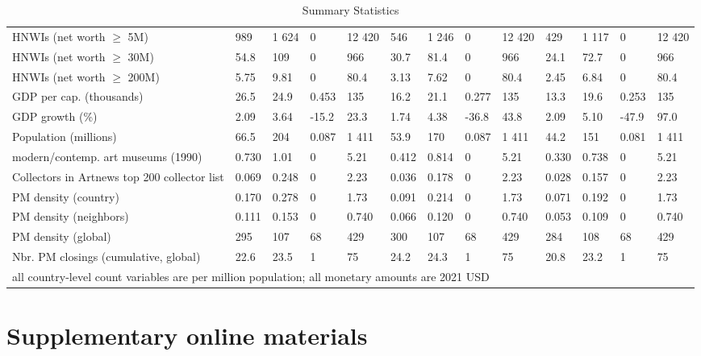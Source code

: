 \documentclass[11pt]{article}
\begin{document}
\begin{landscape}
\begin{table}[ht]
\begin{tabular}{p{7cm}llllllllllll}
  HNWIs (net worth $\geq$ 5M) & 989 & 1 624 & 0 & 12 420 & 546 & 1 246 & 0 & 12 420 & 429 & 1 117 & 0 & 12 420 \\ 
  HNWIs (net worth $\geq$ 30M) & 54.8 & 109 & 0 & 966 & 30.7 & 81.4 & 0 & 966 & 24.1 & 72.7 & 0 & 966 \\ 
  HNWIs (net worth $\geq$ 200M) & 5.75 & 9.81 & 0 & 80.4 & 3.13 & 7.62 & 0 & 80.4 & 2.45 & 6.84 & 0 & 80.4 \\ 
  GDP per cap. (thousands) & 26.5 & 24.9 & 0.453 & 135 & 16.2 & 21.1 & 0.277 & 135 & 13.3 & 19.6 & 0.253 & 135 \\ 
  GDP growth (\%) & 2.09 & 3.64 & -15.2 & 23.3 & 1.74 & 4.38 & -36.8 & 43.8 & 2.09 & 5.10 & -47.9 & 97.0 \\ 
  Population (millions) & 66.5 & 204 & 0.087 & 1 411 & 53.9 & 170 & 0.087 & 1 411 & 44.2 & 151 & 0.081 & 1 411 \\ 
  modern/contemp. art museums (1990) & 0.730 & 1.01 & 0 & 5.21 & 0.412 & 0.814 & 0 & 5.21 & 0.330 & 0.738 & 0 & 5.21 \\ 
  Collectors in Artnews top 200 collector list & 0.069 & 0.248 & 0 & 2.23 & 0.036 & 0.178 & 0 & 2.23 & 0.028 & 0.157 & 0 & 2.23 \\ 
  PM density (country) & 0.170 & 0.278 & 0 & 1.73 & 0.091 & 0.214 & 0 & 1.73 & 0.071 & 0.192 & 0 & 1.73 \\ 
  PM density (neighbors) & 0.111 & 0.153 & 0 & 0.740 & 0.066 & 0.120 & 0 & 0.740 & 0.053 & 0.109 & 0 & 0.740 \\ 
  PM density (global) & 295 & 107 & 68 & 429 & 300 & 107 & 68 & 429 & 284 & 108 & 68 & 429 \\ 
  Nbr. PM closings (cumulative, global) & 22.6 & 23.5 & 1 & 75 & 24.2 & 24.3 & 1 & 75 & 20.8 & 23.2 & 1 & 75 \\ 
   \hline \multicolumn{13}{l}{\footnotesize{all country-level count variables are per million population; all monetary amounts are 2021 USD}}
\end{tabular}
\caption{Summary Statistics} 
\label{tbl:descs}
\end{table}
\end{landscape}

\FloatBarrier


\section*{Supplementary online materials}



\appendix
\setcounter{page}{1}
\end{document}
